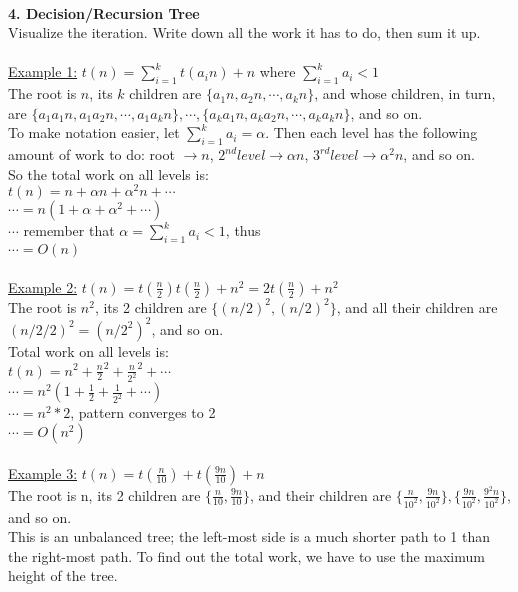 \documentclass[8pt,letterpaper,twocolumn]{article}
\begin{document}
\\
\textbf{4. Decision/Recursion Tree}\\
Visualize the iteration. Write down all the work it has to do, then sum it up.\\
\\
\underline{Example 1:} $t(n)=\sum_{i=1}^kt(a_in)+n$ where $\sum_{i=1}^ka_i<1$\\
The root is $n$, its $k$ children are $\{a_1n, a_2n,\cdots, a_kn\}$, and whose children, in turn,
are $\{a_1a_1n, a_1a_2n, \cdots, a_1a_kn\},\cdots,\{a_ka_1n, a_ka_2n, \cdots , a_ka_kn\}$, and so on.\\
To make notation easier, let $\sum_{i=1}^ka_i=\alpha$. Then each level has the following amount of work to do: root $\rightarrow n$,
$2^{nd} level \rightarrow \alpha n$, $3^{rd} level \rightarrow \alpha^2 n$, and so on.\\
So the total work on all levels is:\\
$t(n) = n + \alpha n + \alpha^2 n + \cdots$\\
$\cdots= n(1 + \alpha + \alpha^2 + \cdots)$\\
$\cdots$ remember that $\alpha=\sum_{i=1}^ka_i<1$, thus\\
$\cdots= O(n)$\\
\\
\underline{Example 2:} $t(n)=t(\frac{n}{2})t(\frac{n}{2})+n^2=2t(\frac{n}{2})+n^2$\\
The root is $n^2$, its 2 children are $\{(n/2)^2, (n/2)^2\}$, and all their children are
$(n/2/2)^2=(n/2^2)^2$, and so on.\\
Total work on all levels is:\\
$t(n) = n^2 + \frac{n}{2}^2 + \frac{n}{2^2}^2 + \cdots$\\
$\cdots= n^2(1 + \frac{1}{2} + \frac{1}{2^2} + \cdots)$\\
$\cdots=n^2*2$, pattern converges to 2\\
$\cdots= O(n^2)$\\
\\
\underline{Example 3:} $t(n)=t(\frac{n}{10})+t(\frac{9n}{10})+n$\\
The root is n, its 2 children are $\{\frac{n}{10}, \frac{9n}{10}\}$, and their children are
$\{\frac{n}{10^2}, \frac{9n}{10^2}\},\{\frac{9n}{10^2}, \frac{9^2n}{10^2}\}$, and so on.\\
This is an unbalanced tree; the left-most side is a much shorter path to 1 than the right-most path.
To find out the total work, we have to use the maximum height of the tree.\\
\end{document}
